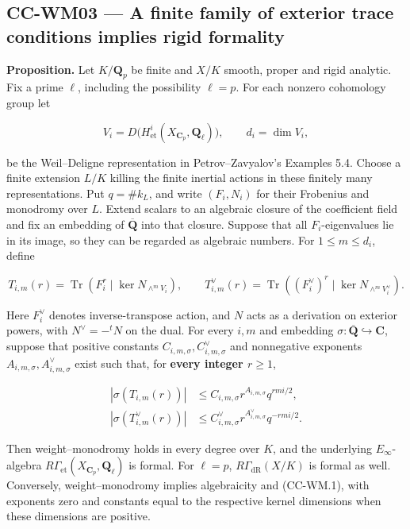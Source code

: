 \subsection{CC-WM03 --- A finite family of exterior trace conditions
implies rigid
formality}\label{cc-wm03-a-finite-family-of-exterior-trace-conditions-implies-rigid-formality}

\textbf{Proposition.} Let \(K/\mathbf Q_p\) be finite and \(X/K\)
smooth, proper and rigid analytic. Fix a prime \(\ell\), including the
possibility \(\ell=p\). For each nonzero cohomology group let

\[
 V_i=D\bigl(H^i_{\mathrm{et}}(X_{\mathbf C_p},\mathbf Q_\ell)\bigr),
 \qquad d_i=\dim V_i,
\]

be the Weil--Deligne representation in Petrov--Zavyalov's Examples 5.4.
Choose a finite extension \(L/K\) killing the finite inertial actions in
these finitely many representations. Put \(q=\#k_L\), and write
\((F_i,N_i)\) for their Frobenius and monodromy over \(L\). Extend
scalars to an algebraic closure of the coefficient field and fix an
embedding of \(\overline{\mathbf Q}\) into that closure. Suppose that
all \(F_i\)-eigenvalues lie in its image, so they can be regarded as
algebraic numbers. For \(1\le m\le d_i\), define

\[
 T_{i,m}(r)=\operatorname{Tr}\left(F_i^r\mid
       \ker N_{\wedge^m V_i}\right),\qquad
 T^\vee_{i,m}(r)=\operatorname{Tr}\left((F_i^\vee)^r\mid
       \ker N_{\wedge^m V_i^\vee}\right).
\]

Here \(F_i^\vee\) denotes inverse-transpose action, and \(N\) acts as a
derivation on exterior powers, with \(N^\vee=-{}^tN\) on the dual. For
every \(i,m\) and embedding
\(\sigma:\overline{\mathbf Q}\hookrightarrow\mathbf C\), suppose that
positive constants \(C_{i,m,\sigma},C^\vee_{i,m,\sigma}\) and
nonnegative exponents \(A_{i,m,\sigma},A^\vee_{i,m,\sigma}\) exist such
that, for \textbf{every integer \(r\ge1\)},

\[
 \begin{split}
 |\sigma(T_{i,m}(r))|&\le C_{i,m,\sigma}r^{A_{i,m,\sigma}}q^{rmi/2},\\
 |\sigma(T^\vee_{i,m}(r))|&\le C^\vee_{i,m,\sigma}r^{A^\vee_{i,m,\sigma}}q^{-rmi/2}.
 \end{split} \tag{CC-WM.1}
\]

Then weight--monodromy holds in every degree over \(K\), and the
underlying \(E_\infty\)-algebra
\(R\Gamma_{\mathrm{et}}(X_{\mathbf C_p},\mathbf Q_\ell)\) is formal. For
\(\ell=p\), \(R\Gamma_{\mathrm{dR}}(X/K)\) is formal as well.
Conversely, weight--monodromy implies algebraicity and (CC-WM.1), with
exponents zero and constants equal to the respective kernel dimensions
when these dimensions are positive.

